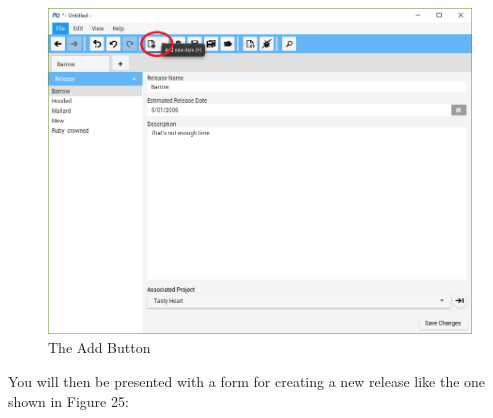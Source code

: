\begin{figure}[H]
\centering
\includegraphics[width=\textwidth]{images/screenshots/releases2.PNG}
\caption{The Add Button}
\label{fig:new_project}
\end{figure}

You will then be presented with a form for creating a new release like the one shown in Figure 25:

